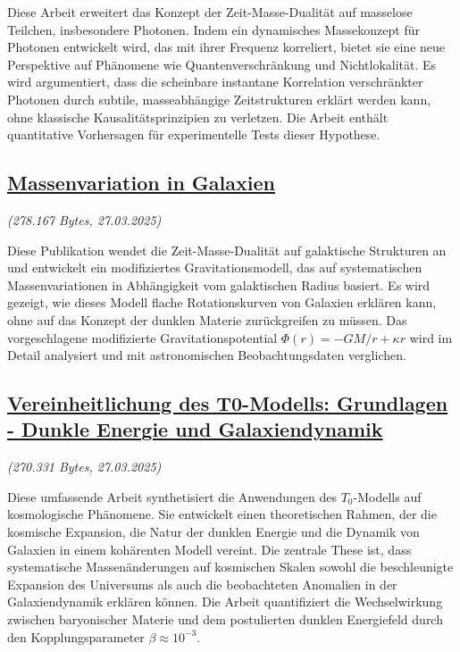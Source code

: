 \documentclass[a4paper,12pt]{article}
\newcommand{\repobase}{https://github.com/jpascher/T0-Time-Mass-Duality/tree/main/2/}
\begin{document}
	Diese Arbeit erweitert das Konzept der Zeit-Masse-Dualität auf masselose Teilchen, insbesondere Photonen. Indem ein dynamisches Massekonzept für Photonen entwickelt wird, das mit ihrer Frequenz korreliert, bietet sie eine neue Perspektive auf Phänomene wie Quantenverschränkung und Nichtlokalität. Es wird argumentiert, dass die scheinbare instantane Korrelation verschränkter Photonen durch subtile, masseabhängige Zeitstrukturen erklärt werden kann, ohne klassische Kausalitätsprinzipien zu verletzen. Die Arbeit enthält quantitative Vorhersagen für experimentelle Tests dieser Hypothese.
	
	\subsection{\href{\repobase/pdf/Deutsch/Massenvariation in Galaxien.pdf}{Massenvariation in Galaxien}}
	\textit{(278.167 Bytes, 27.03.2025)}
	
	Diese Publikation wendet die Zeit-Masse-Dualität auf galaktische Strukturen an und entwickelt ein modifiziertes Gravitationsmodell, das auf systematischen Massenvariationen in Abhängigkeit vom galaktischen Radius basiert. Es wird gezeigt, wie dieses Modell flache Rotationskurven von Galaxien erklären kann, ohne auf das Konzept der dunklen Materie zurückgreifen zu müssen. Das vorgeschlagene modifizierte Gravitationspotential $\Phi(r) = -GM/r + \kappa r$ wird im Detail analysiert und mit astronomischen Beobachtungsdaten verglichen.
	
	\subsection{\href{\repobase/pdf/Deutsch/Vereinheitlichung des T0-Modells Grundlagen - Dunkle Energie und Galaxiendynamik.pdf}{Vereinheitlichung des T0-Modells: Grundlagen - Dunkle Energie und Galaxiendynamik}}
	\textit{(270.331 Bytes, 27.03.2025)}
	
	Diese umfassende Arbeit synthetisiert die Anwendungen des $T_0$-Modells auf kosmologische Phänomene. Sie entwickelt einen theoretischen Rahmen, der die kosmische Expansion, die Natur der dunklen Energie und die Dynamik von Galaxien in einem kohärenten Modell vereint. Die zentrale These ist, dass systematische Massenänderungen auf kosmischen Skalen sowohl die beschleunigte Expansion des Universums als auch die beobachteten Anomalien in der Galaxiendynamik erklären können. Die Arbeit quantifiziert die Wechselwirkung zwischen baryonischer Materie und dem postulierten dunklen Energiefeld durch den Kopplungsparameter $\beta \approx 10^{-3}$.
	
\end{document}
